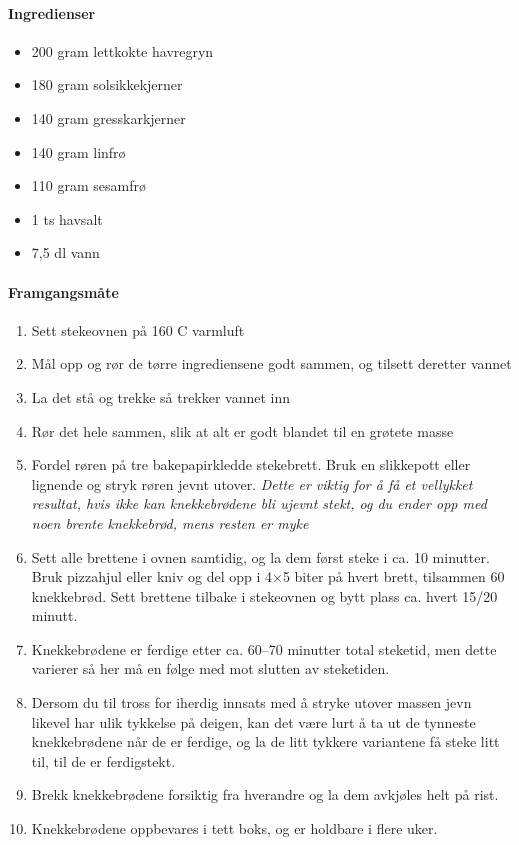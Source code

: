 \documentclass[12pt,a4paper]{book}
\begin{document}
{\paragraph{Ingredienser}
\begin{itemize}[noitemsep]
	\item 200 gram lettkokte havregryn
	\item 180 gram solsikkekjerner
	\item 140 gram gresskarkjerner
	\item 140 gram linfrø
	\item 110 gram sesamfrø
	\item 1 ts havsalt
	\item 7,5 dl vann
\end{itemize}

\paragraph{Framgangsmåte}
\begin{enumerate}[noitemsep]
	\item Sett stekeovnen på 160 \degree C varmluft
	\item Mål opp og rør de tørre ingrediensene godt sammen, og tilsett deretter vannet
	\item La det stå og trekke så trekker vannet inn
	\item Rør det hele sammen, slik at alt er godt blandet til en grøtete masse
	\item Fordel røren på tre bakepapirkledde stekebrett. Bruk en slikkepott eller lignende og stryk røren jevnt utover. \emph{Dette er viktig for å få et vellykket resultat, hvis ikke kan knekkebrødene bli ujevnt stekt, og du ender opp med noen brente knekkebrød, mens resten er myke}
	\item Sett alle brettene i ovnen samtidig, og la dem først steke i ca. 10 minutter. Bruk pizzahjul eller kniv og del opp i 4×5 biter på hvert brett, tilsammen 60 knekkebrød. Sett brettene tilbake i stekeovnen og bytt plass ca. hvert 15/20 minutt.
	\item Knekkebrødene er ferdige etter ca. 60--70 minutter total steketid, men dette varierer så her må en følge med mot slutten av steketiden.
	\item Dersom du til tross for iherdig innsats med å stryke utover massen jevn likevel har ulik tykkelse på deigen, kan det være lurt å ta ut de tynneste knekkebrødene når de er ferdige, og la de litt tykkere variantene få steke litt til, til de er ferdigstekt.
	\item Brekk knekkebrødene forsiktig fra hverandre og la dem avkjøles helt på rist.
	\item Knekkebrødene oppbevares i tett boks, og er holdbare i flere uker.
\end{enumerate}



}
\end{document}
